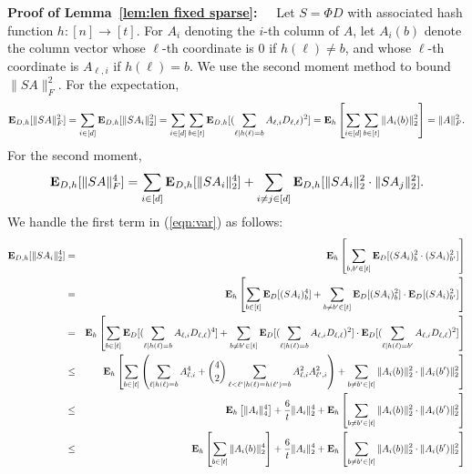 \documentclass{sig-alternate}
\def\FullBox{\hbox{\vrule width 8pt height 8pt depth 0pt}}
\def\qed{\ifmmode\qquad\FullBox\else{\unskip\nobreak\hfil
\penalty50\hskip1em\null\nobreak\hfil\FullBox
\parfillskip=0pt\finalhyphendemerits=0\endgraf}\fi}
\newenvironment{proofof}[1]{\begin{trivlist} \item {\bf Proof
#1:~~}}
  {\qed\end{trivlist}}
\begin{document}
\begin{proofof}{of Lemma~\ref{lem:len fixed sparse}}
Let $S = \Phi D$ with associated hash function $h:[n] \rightarrow [t]$. 
For $A_i$ denoting the $i$-th column of $A$, 
let $A_i(b)$ denote the column vector whose $\ell$-th coordinate is $0$ if 
$h(\ell) \neq b$, and whose $\ell$-th coordinate is $A_{\ell,i}$ if $h(\ell) = b$.
We use the second moment method to bound $\|SA\|_F^2$. For the expectation,
\begin{eqnarray}\label{eqn:exp}
{\bf E}_{D,h}[\|SA\|_F^2] = \sum_{i \in [d]} {\bf E}_{D,h}[\|SA_i\|_2^2]
= \sum_{i \in [d]} \sum_{b \in [t]} {\bf E}_{D,h}[(\sum_{\ell \mid h(\ell) = b} A_{\ell, i} D_{\ell, \ell} )^2]
= {\bf E}_h \left [\sum_{i \in [d]} \sum_{b \in [t]} \|A_i(b)\|_2^2 \right ]
= \|A\|_F^2.
\end{eqnarray}
For the second moment, 
\begin{eqnarray}\label{eqn:var}
{\bf E}_{D,h}[\|SA\|_F^4] = \sum_{i \in [d]} {\bf E}_{D,h}[\|SA_i\|_2^4]
+ \sum_{i \neq j \in [d]} {\bf E}_{D,h}[\|SA_i\|_2^2 \cdot \|SA_j\|_2^2].
\end{eqnarray}
We handle the first term in (\ref{eqn:var}) as follows:
\begin{eqnarray*}
{\bf E}_{D,h} [\|SA_i\|_2^4] 
& = & {\bf E}_h \left [\sum_{b,b' \in [t]} {\bf E}_D [(SA_i)_b^2 \cdot (SA_i)_{b'}^2] \right ]\\
& = & {\bf E}_h \left [\sum_{b \in [t]} {\bf E}_D [(SA_i)_b^4] + \sum_{b \neq b' \in [t]} {\bf E}_D [(SA_i)_b^2] \cdot {\bf E}_D [(SA_i)_{b'}^2] \right ]\\
& = & {\bf E}_h \left [\sum_{b \in [t]} {\bf E}_D [(\sum_{\ell \mid h(\ell) = b} A_{\ell, i} D_{\ell, \ell})^4]
+ \sum_{b \neq b' \in [t]} {\bf E}_D [(\sum_{\ell \mid h(\ell) = b} A_{\ell, i} D_{\ell, \ell})^2] \cdot
{\bf E}_D [(\sum_{\ell \mid h(\ell) = b'} A_{\ell, i} D_{\ell, \ell})^2]\right ]\\
& \leq & {\bf E}_h \left [\sum_{b \in [t]} \left (\sum_{\ell \mid h(\ell) = b} A^4_{\ell, i}  +
{4 \choose 2} \sum_{\ell < \ell' \mid h(\ell) = h(\ell') = b} A^2_{\ell, i} A^2_{\ell',i} \right )
+ \sum_{b \neq b' \in [t]} \|A_i(b)\|_2^2 \cdot \|A_i(b')\|_2^2 \right ]\\
& \leq & {\bf E}_h \left [\|A_i\|_4^4 \right ]+ \frac{6}{t} \|A_i\|_2^4 + {\bf E}_h \left [\sum_{b \neq b' \in [t]} \|A_i(b)\|_2^2 \cdot \|A_i(b')\|_2^2 \right ]\\
& \leq & {\bf E}_h \left [\sum_{b \in [t]} \|A_i(b)\|_2^4 \right ]+ \frac{6}{t} \|A_i\|_2^4 + 
{\bf E}_h \left [\sum_{b \neq b' \in [t]} \|A_i(b)\|_2^2 \cdot \|A_i(b')\|_2^2 \right ]\\

\end{eqnarray*}
\end{proofof}
\end{document}
